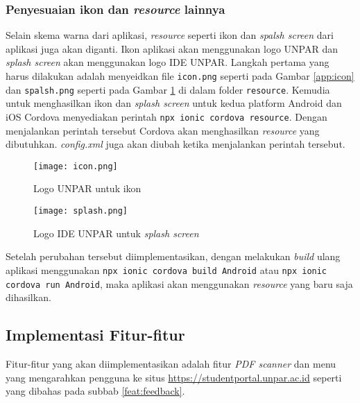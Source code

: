 \subsubsection{Penyesuaian ikon dan \textit{resource} lainnya}
Selain skema warna dari aplikasi, \textit{resource} seperti ikon dan \textit{spalsh screen} dari aplikasi juga akan diganti. Ikon aplikasi akan menggunakan logo UNPAR dan \textit{splash screen} akan menggunakan logo IDE UNPAR. Langkah pertama yang harus dilakukan adalah menyeidkan file \texttt{icon.png} seperti pada Gambar \ref{app:icon} dan \texttt{spalsh.png} seperti pada Gambar \ref{app:splash} di dalam folder \texttt{resource}. Kemudia untuk menghasilkan ikon dan \textit{splash screen} untuk kedua platform Android dan iOS Cordova menyediakan perintah \texttt{npx ionic cordova resource}. Dengan menjalankan perintah tersebut Cordova akan menghasilkan \textit{resource} yang dibutuhkan. \textit{config.xml} juga akan diubah ketika menjalankan perintah tersebut.

\begin{figure}[H] 
\begin{minipage}{.5\textwidth}
	\centering  
	\texttt{[image: icon.png]}  
	\caption[Logo  UNPAR] {Logo  UNPAR untuk ikon} 
	\label{app:icon}
\end{minipage}
\begin{minipage}{.5\textwidth}
	\centering  
	\texttt{[image: splash.png]}  
	\caption[Logo IDE UNPAR untuk \textit{splash screen}] {Logo IDE UNPAR untuk \textit{splash screen}} 
	\label{app:splash} 
\end{minipage}
\end{figure} 




Setelah perubahan tersebut diimplementasikan, dengan melakukan \textit{build} ulang aplikasi menggunakan \texttt{npx ionic cordova build Android} atau \texttt{npx ionic cordova run Android}, maka aplikasi akan menggunakan \textit{resource} yang baru saja dihasilkan.

\subsection{Implementasi Fitur-fitur}
Fitur-fitur yang akan diimplementasikan adalah fitur \textit{PDF scanner} dan menu yang mengarahkan pengguna ke situs \url{https://studentportal.unpar.ac.id} seperti yang dibahas pada subbab \ref{feat:feedback}.%

